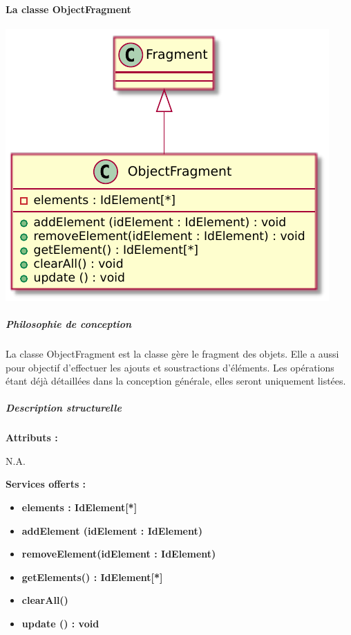 \paragraph{La classe ObjectFragment}

\begin{minipage}
    {\linewidth}
    \centering
    \includegraphics[width=0.80\linewidth]{../schemas/Conception_detaillee/classe_basket.pdf}
\end{minipage}

\subparagraph{Philosophie de conception \newline} 

\medspace

La classe ObjectFragment est la classe gère le fragment des objets. Elle a aussi pour objectif d'effectuer les  ajouts et soustractions d'éléments. Les opérations étant déjà détaillées dans la conception générale, elles seront uniquement listées.

\subparagraph{Description structurelle \newline}

\medspace

\textbf{Attributs :}

N.A.

\textbf{Services offerts :}

\begin{itemize}
    \item \textbf{elements : IdElement[*]} 
    \item \textbf{addElement (idElement : IdElement)} 
    \item \textbf{removeElement(idElement : IdElement)} 
    \item \textbf{getElements() : IdElement[*]} 
    \item \textbf{clearAll()} 
    \item \textbf{update () : void}


\end{itemize}


